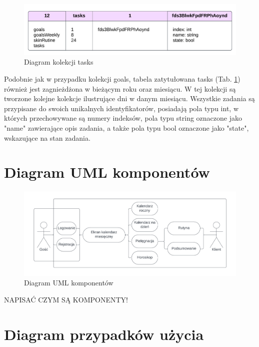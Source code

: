 \begin{figure}[h]
	\centering
	\includegraphics[width=1\linewidth]{images/model_danych/tasks}
	\caption{Diagram kolekcji tasks}
	\label{fig:tasks}
\end{figure}

Podobnie jak w przypadku kolekcji goals, tabela zatytułowana tasks (Tab. \ref{fig:tasks}) również jest zagnieżdżona w bieżącym roku oraz miesiącu. W tej kolekcji są tworzone kolejne kolekcje ilustrujące dni w danym miesiącu. Wszystkie zadania są przypisane do swoich unikalnych identyfikatorów, posiadają pola typu int, w których przechowywane są numery indeksów, pola typu string oznaczone jako "name" zawierające opis zadania, a także pola typu bool oznaczone jako "state", wskazujące na stan zadania.

\section*{Diagram UML komponentów}

\begin{figure}[h]
	\centering
	\includegraphics[width=1\linewidth]{images/model_danych/uml}
	\caption{Diagram UML komponentów}
	\label{fig:uml}
\end{figure}

NAPISAĆ CZYM SĄ KOMPONENTY!

\section*{Diagram przypadków użycia}

